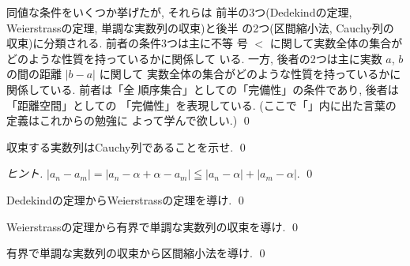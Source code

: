 \documentclass[12pt,twoside]{jarticle}
\begin{document}
\begin{rem}
%
同値な条件をいくつか挙げたが, それらは
前半の3つ(Dedekindの定理, Weierstrassの定理, 単調な実数列の収束)と後半
の2つ(区間縮小法, Cauchy列の収束)に分類される. 前者の条件3つは主に不等
号 $<$ に関して実数全体の集合がどのような性質を持っているかに関係して
いる. 一方, 後者の2つは主に実数 $a$, $b$ の間の距離 $|b - a|$ に関して
実数全体の集合がどのような性質を持っているかに関係している. 前者は「全
順序集合」としての「完備性」の条件であり, 後者は「距離空間」としての
「完備性」を表現している. (ここで「」内に出た言葉の定義はこれからの勉強に
よって学んで欲しい.)
\qed
\end{rem}

\begin{question}
 収束する実数列はCauchy列であることを示せ. \qed
\end{question}

\begin{proof}[ヒント]
 $|a_n-a_m|=|a_n-\alpha+\alpha-a_m|\leqq|a_n-\alpha|+|a_m-\alpha|$.
 \qed
\end{proof}

\begin{question}
  Dedekindの定理からWeierstrassの定理を導け.  \qed
\end{question}

\begin{question}
  Weierstrassの定理から有界で単調な実数列の収束を導け. \qed
\end{question}

\begin{question}\qstar{*}
  有界で単調な実数列の収束から区間縮小法を導け. \qed
\end{question}
\end{document}
